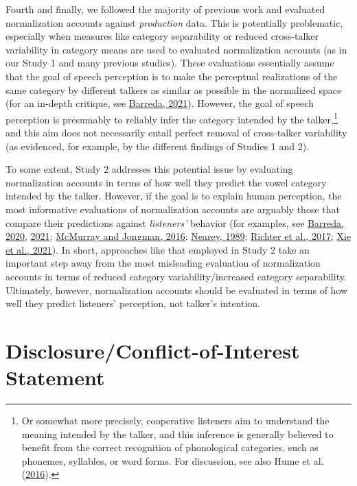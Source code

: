\documentclass[utf8]{frontiersSCNS}
\begin{document}
Fourth and finally, we followed the majority of previous work and evaluated normalization accounts against \emph{production} data. This is potentially problematic, especially when measures like category separability or reduced cross-talker variability in category means are used to evaluated normalization accounts (as in our Study 1 and many previous studies). These evaluations essentially assume that the goal of speech perception is to make the perceptual realizations of the same category by different talkers as similar as possible in the normalized space (for an in-depth critique, see \protect\hyperlink{ref-barreda2021}{Barreda, 2021}). However, the goal of speech perception is presumably to reliably infer the category intended by the talker,\footnote{Or somewhat more precisely, cooperative listeners aim to understand the meaning intended by the talker, and this inference is generally believed to benefit from the correct recognition of phonological categories, such as phonemes, syllables, or word forms. For discussion, see also Hume et al. (\protect\hyperlink{ref-hume2016}{2016}).} and this aim does not necessarily entail perfect removal of cross-talker variability (as evidenced, for example, by the different findings of Studies 1 and 2).

To some extent, Study 2 addresses this potential issue by evaluating normalization accounts in terms of how well they predict the vowel category intended by the talker. However, if the goal is to explain human perception, the most informative evaluations of normalization accounts are arguably those that compare their predictions against \emph{listeners'} behavior (for examples, see \protect\hyperlink{ref-barreda2020a}{Barreda, 2020}, \protect\hyperlink{ref-barreda2021}{2021}; \protect\hyperlink{ref-mcmurray-jongman2016}{McMurray and Jongman, 2016}; \protect\hyperlink{ref-nearey1989}{Nearey, 1989}; \protect\hyperlink{ref-richter2017}{Richter et al., 2017}; \protect\hyperlink{ref-xie2021cognition}{Xie et al., 2021}). In short, approaches like that employed in Study 2 take an important step away from the most misleading evaluation of normalization accounts in terms of reduced category variability/increased category separability. Ultimately, however, normalization accounts should be evaluated in terms of how well they predict listeners' perception, not talker's intention.

\hypertarget{disclosureconflict-of-interest-statement}{%
\section*{Disclosure/Conflict-of-Interest Statement}\label{disclosureconflict-of-interest-statement}}
\end{document}
